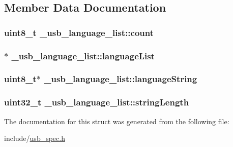 \subsection{Member Data Documentation}
\hypertarget{struct__usb__language__list_a1a05af528d489960bcbe85dc956b5619}{
\subsubsection[{count}]{\setlength{\rightskip}{0pt plus 5cm}uint8\-\_\-t \-\_\-usb\-\_\-language\-\_\-list\-::count}}\label{struct__usb__language__list_a1a05af528d489960bcbe85dc956b5619}
\hypertarget{struct__usb__language__list_ae5654580ba26e165fd12130418705d2d}{
\subsubsection[{language\-List}]{$\ast$ \-\_\-usb\-\_\-language\-\_\-list\-::language\-List}}\label{struct__usb__language__list_ae5654580ba26e165fd12130418705d2d}
\hypertarget{struct__usb__language__list_a6748d4e8c84c9f79ae6bb19e6cba084b}{
\subsubsection[{language\-String}]{\setlength{\rightskip}{0pt plus 5cm}uint8\-\_\-t$\ast$ \-\_\-usb\-\_\-language\-\_\-list\-::language\-String}}\label{struct__usb__language__list_a6748d4e8c84c9f79ae6bb19e6cba084b}
\hypertarget{struct__usb__language__list_aa8f0e2c1f75a72223ef7bf98eebbb69c}{
\subsubsection[{string\-Length}]{\setlength{\rightskip}{0pt plus 5cm}uint32\-\_\-t \-\_\-usb\-\_\-language\-\_\-list\-::string\-Length}}\label{struct__usb__language__list_aa8f0e2c1f75a72223ef7bf98eebbb69c}


The documentation for this struct was generated from the following file\-:\begin{DoxyCompactItemize}
\item 
include/\hyperlink{usb__spec_8h}{usb\-\_\-spec.\-h}\end{DoxyCompactItemize}
